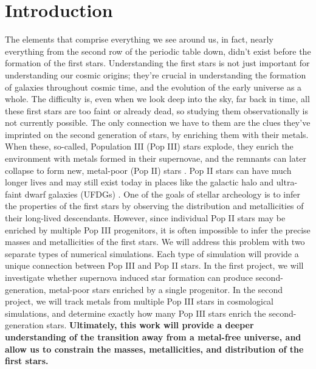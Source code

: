 \documentclass[letterpaper, 12pt]{article}
\begin{document}
\thispagestyle{fancyplain}

\section{Introduction}

The elements that comprise everything we see around us, in fact, nearly everything from the second row of the periodic table down, didn't exist before the formation of the first stars. Understanding the first stars is not just important for understanding our cosmic origins; they're crucial in understanding the formation of galaxies throughout cosmic time, and the evolution of the early universe as a whole. The difficulty is, even when we look deep into the sky, far back in time, all these first stars are too faint or already dead, so studying them observationally is not currently possible. The only connection we have to them are the clues they've imprinted on the second generation of stars, by enriching them with their metals. When these, so-called, Population III (Pop III) stars explode, they enrich the environment with metals formed in their supernovae, and the remnants can later collapse to form new, metal-poor (Pop II) stars \citep{Chiaki2019}. Pop II stars can have much longer lives and may still exist today in places like the galactic halo and ultra-faint dwarf galaxies (UFDGs) \citep{Kirby2008}. One of the goals of stellar archeology is to infer the properties of the first stars by observing the distribution and metallicities of their long-lived descendants. However, since individual Pop II stars may be enriched by multiple Pop III progenitors, it is often impossible to infer the precise masses and metallicities of the first stars. We will address this problem with two separate types of numerical simulations. Each type of simulation will provide a unique connection between Pop III and Pop II stars. In the first project, we will investigate whether supernova induced star formation can produce second-generation, metal-poor stars enriched by a single progenitor. In the second project, we will track metals from multiple Pop III stars in cosmological simulations, and determine exactly how many Pop III stars enrich the second-generation stars. \textbf{Ultimately, this work will provide a deeper understanding of the transition away from a metal-free universe, and allow us to constrain the masses, metallicities, and distribution of the first stars.}
\end{document}
